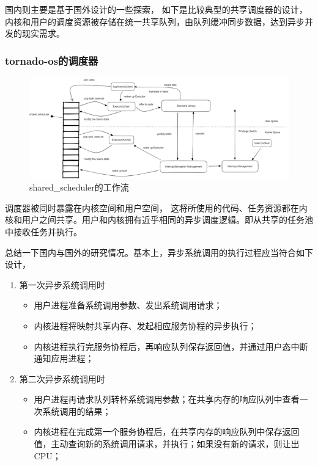 国内则主要是基于国外设计的一些探索， 如下是比较典型的共享调度器的设计，内核和用户的调度资源被存储在统一共享队列，由队列缓冲同步数据，达到异步并发的现实需求。

\subsubsection{tornado-os的调度器}

\begin{figure}[htb]
    \figureCapSet
    \centering
    \includegraphics[width=.8\linewidth]{figure/c1/sharedscheduler.png}
    \caption{shared\_scheduler的工作流}
    \label{figure:c1sharedscheduler}
\end{figure}

调度器被同时暴露在内核空间和用户空间， 这将所使用的代码、任务资源都在内核和用户之间共享。用户和内核拥有近乎相同的异步调度逻辑。即从共享的任务池中接收任务并执行。

总结一下国内与国外的研究情况。基本上，异步系统调用的执行过程应当符合如下设计，

\begin{enumerate}
    \item 第一次异步系统调用时
    \begin{itemize}
        \item 用户进程准备系统调用参数、发出系统调用请求；
        \item 内核进程将映射共享内存、发起相应服务协程的异步执行；
        \item 内核进程执行完服务协程后，再响应队列保存返回值，并通过用户态中断通知应用进程；
    \end{itemize}

    \item 第二次异步系统调用时
    \begin {itemize}
        \item 用户进程再请求队列转杯系统调用参数；在共享内存的响应队列中查看一次系统调用的结果；
        \item 内核进程在完成第一个服务协程后，在共享内存的响应队列中保存返回值，主动查询新的系统调用请求，并执行；如果没有新的请求，则让出CPU；
    \end{itemize}
\end{enumerate}

